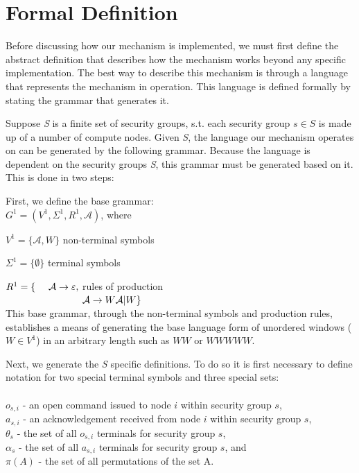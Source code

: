 \documentclass[oneside,12pt]{memoir}
\newcommand{\tab}{\hspace*{2em}}
\begin{document}
\chapter{Formal Definition}
Before discussing how our mechanism is implemented, we must first define the abstract definition that describes how the mechanism works beyond any specific implementation. The best way to describe this mechanism is through a language that represents the mechanism in operation. This language is defined formally by stating the grammar that generates it.

Suppose \emph{S} is a finite set of security groups, s.t. each security group $s\in S$ is made up of a number of compute nodes. Given \emph{S}, the language our mechanism operates on can be generated by the following grammar. Because the language is dependent on the security groups \emph{S}, this grammar must be generated based on it. This is done in two steps:

First, we define the base grammar:\\

\tab $G^1 = (V^1, \Sigma^1, R^1, \mathcal{A})$, where

\tab $V^1 = \{\mathcal{A} , W\}$ \hfill non-terminal symbols \hspace*{6em}

\tab $\Sigma ^1 = \{ \emptyset\}$ \hfill terminal symbols\hspace*{6.3em}

\tab $R^1 = \lbrace \hspace*{1.35em}\mathcal{A} \rightarrow \varepsilon ,$ \hfill rules of production \hspace*{6em} \\
$\tab \hspace*{5.9em} \mathcal{A}\rightarrow W\mathcal{A} |W\rbrace$\\

This base grammar, through the non-terminal symbols and production rules, establishes a means of generating the base language form of unordered windows ($W\in V^1$) in an arbitrary length such as $WW$ or $WWWWW$.

Next, we generate the \emph{S} specific definitions. To do so it is first necessary to define notation for two special terminal symbols and three special sets:\\
\\
$o_{s,i}$ - an open command issued to node $i$ within security group $s$,\\
$a_{s,i}$ - an acknowledgement received from node $i$ within security group $s$,\\
$\theta_s$ - the set of all $o_{s,i}$ terminals for security group $s$, \\
$\alpha_s$ - the set of all $a_{s,i}$ terminals for security group $s$, and \\
$\pi(A)$ - the set of all permutations of the set A.\\
\end{document}
